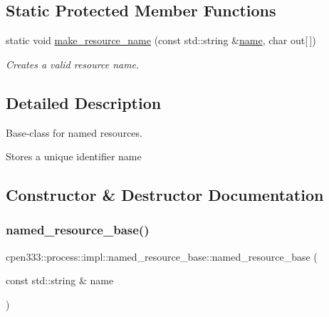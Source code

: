 \subsection*{Static Protected Member Functions}
\begin{DoxyCompactItemize}
\item 
static void \hyperlink{classcpen333_1_1process_1_1impl_1_1named__resource__base_a3a513fc13851a3a72b4cc5ea8aa0e104}{make\+\_\+resource\+\_\+name} (const std\+::string \&\hyperlink{classcpen333_1_1process_1_1impl_1_1named__resource__base_ae0c5fbb1843afe863cece4b51c38f807}{name}, char out\mbox{[}$\,$\mbox{]})
\begin{DoxyCompactList}\small\item\em Creates a valid resource name. \end{DoxyCompactList}\end{DoxyCompactItemize}


\subsection{Detailed Description}
Base-\/class for named resources. 

Stores a unique identifier name 

\subsection{Constructor \& Destructor Documentation}
\mbox{\label{classcpen333_1_1process_1_1impl_1_1named__resource__base_a5f6f8b6daec88189a041de4c60ad4518}} 
\subsubsection{\texorpdfstring{named\+\_\+resource\+\_\+base()}{named\_resource\_base()}}
{\footnotesize\ttfamily cpen333\+::process\+::impl\+::named\+\_\+resource\+\_\+base\+::named\+\_\+resource\+\_\+base (\begin{DoxyParamCaption}\item[{const std\+::string \&}]{name }\end{DoxyParamCaption})\hspace{0.3cm}{\ttfamily [inline]}}



